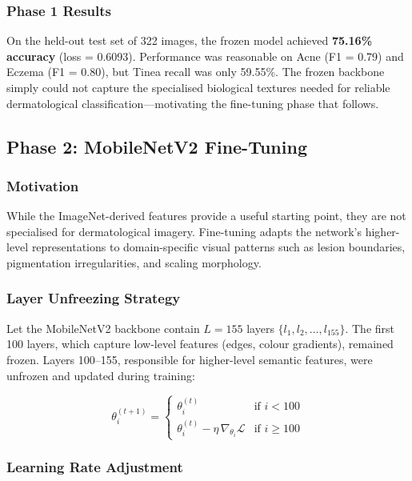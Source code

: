 \subsubsection{Phase 1 Results}

On the held-out test set of 322 images, the frozen model achieved \textbf{75.16\% accuracy} (loss = 0.6093). Performance was reasonable on Acne (F1 = 0.79) and Eczema (F1 = 0.80), but Tinea recall was only 59.55\%. The frozen backbone simply could not capture the specialised biological textures needed for reliable dermatological classification---motivating the fine-tuning phase that follows.


\subsection{Phase 2: MobileNetV2 Fine-Tuning}
\label{sec:phase2}

\subsubsection{Motivation}

While the ImageNet-derived features provide a useful starting point, they are not specialised for dermatological imagery. Fine-tuning adapts the network's higher-level representations to domain-specific visual patterns such as lesion boundaries, pigmentation irregularities, and scaling morphology.

\subsubsection{Layer Unfreezing Strategy}

Let the MobileNetV2 backbone contain $L = 155$ layers $\{l_1, l_2, \ldots, l_{155}\}$. The first 100 layers, which capture low-level features (edges, colour gradients), remained frozen. Layers 100--155, responsible for higher-level semantic features, were unfrozen and updated during training:

\[
\theta_i^{(t+1)} =
\begin{cases}
\theta_i^{(t)} & \text{if } i < 100 \\
\theta_i^{(t)} - \eta \,\nabla_{\theta_i}\mathcal{L} & \text{if } i \geq 100
\end{cases}
\]

\subsubsection{Learning Rate Adjustment}

